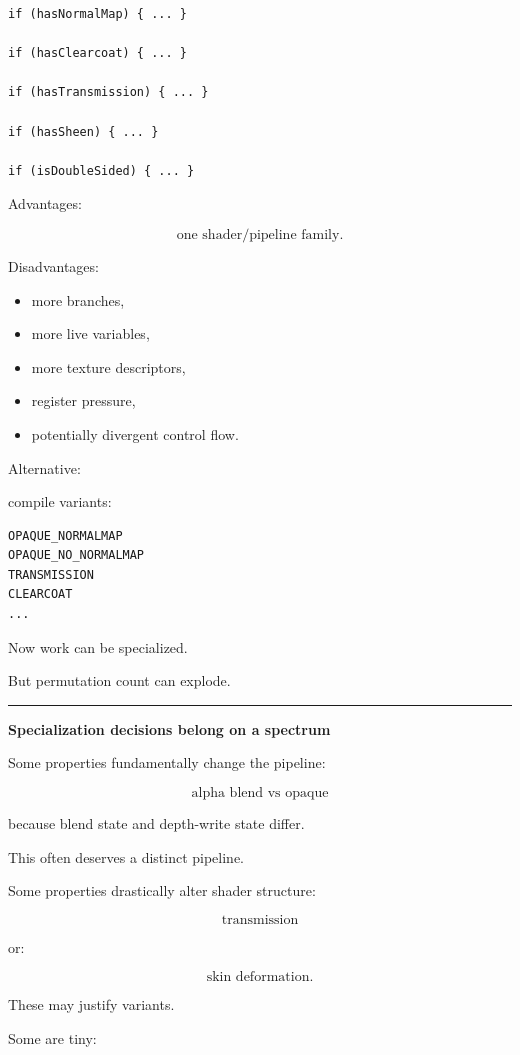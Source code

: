 \begin{verbatim}
if (hasNormalMap) { ... }

if (hasClearcoat) { ... }

if (hasTransmission) { ... }

if (hasSheen) { ... }

if (isDoubleSided) { ... }
\end{verbatim}

Advantages:

\[
\text{one shader/pipeline family}.
\]

Disadvantages:

\begin{itemize}
\tightlist
\item
  more branches,
\item
  more live variables,
\item
  more texture descriptors,
\item
  register pressure,
\item
  potentially divergent control flow.
\end{itemize}

Alternative:

compile variants:

\begin{verbatim}
OPAQUE_NORMALMAP
OPAQUE_NO_NORMALMAP
TRANSMISSION
CLEARCOAT
...
\end{verbatim}

Now work can be specialized.

But permutation count can explode.

\begin{center}\rule{0.5\linewidth}{0.5pt}\end{center}

\textbf{Specialization decisions belong on a spectrum}

Some properties fundamentally change the pipeline:

\[
\text{alpha blend vs opaque}
\]

because blend state and depth-write state differ.

This often deserves a distinct pipeline.

Some properties drastically alter shader structure:

\[
\text{transmission}
\]

or:

\[
\text{skin deformation}.
\]

These may justify variants.

Some are tiny:

